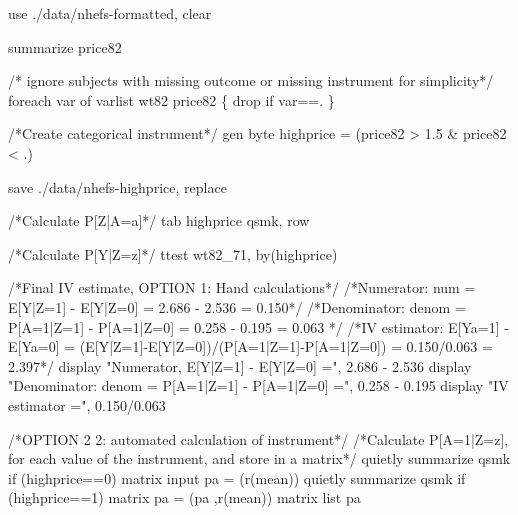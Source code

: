 \documentclass[
  10pt,
  a4paper,
]{book}
\newenvironment{Shaded}{\begin{snugshade}}{\end{snugshade}}
\newcommand{\CommentTok}[1]{\textcolor[rgb]{0.37,0.37,0.37}{#1}}
\newcommand{\FunctionTok}[1]{\textcolor[rgb]{0.28,0.35,0.67}{#1}}
\newcommand{\KeywordTok}[1]{\textcolor[rgb]{0.00,0.46,0.62}{#1}}
\newcommand{\NormalTok}[1]{\textcolor[rgb]{0.00,0.46,0.62}{#1}}
\newcommand{\OtherTok}[1]{\textcolor[rgb]{0.00,0.46,0.62}{#1}}
\newcommand{\StringTok}[1]{\textcolor[rgb]{0.13,0.47,0.30}{#1}}
\begin{document}
\begin{Shaded}
\begin{Highlighting}[]
\KeywordTok{use}\NormalTok{ ./}\KeywordTok{data}\NormalTok{/nhefs{-}formatted, }\KeywordTok{clear}

\KeywordTok{summarize}\NormalTok{ price82}

\CommentTok{/* ignore subjects with missing outcome or missing instrument for simplicity*/}
\KeywordTok{foreach} \KeywordTok{var} \KeywordTok{of} \KeywordTok{varlist}\NormalTok{ wt82 price82 \{}
  \KeywordTok{drop} \KeywordTok{if} \OtherTok{\textasciigrave{}var\textquotesingle{}}\NormalTok{==.}
\NormalTok{\}}

\CommentTok{/*Create categorical instrument*/}
\KeywordTok{gen} \KeywordTok{byte}\NormalTok{ highprice = (price82 \textgreater{} 1.5 \& price82 \textless{} .)}

\KeywordTok{save}\NormalTok{ ./}\KeywordTok{data}\NormalTok{/nhefs{-}highprice, }\KeywordTok{replace}

\CommentTok{/*Calculate P[Z|A=a]*/}
\KeywordTok{tab}\NormalTok{ highprice qsmk, }\OtherTok{row}

\CommentTok{/*Calculate P[Y|Z=z]*/}
\KeywordTok{ttest}\NormalTok{ wt82\_71, }\KeywordTok{by}\NormalTok{(highprice)}

\CommentTok{/*Final IV estimate, OPTION 1: Hand calculations*/}
\CommentTok{/*Numerator: num = E[Y|Z=1] {-} E[Y|Z=0] = 2.686 {-} 2.536 = 0.150*/}
\CommentTok{/*Denominator: denom = P[A=1|Z=1] {-} P[A=1|Z=0] = 0.258 {-} 0.195 = 0.063 */} 
\CommentTok{/*IV estimator: E[Ya=1] {-} E[Ya=0] = }
\CommentTok{(E[Y|Z=1]{-}E[Y|Z=0])/(P[A=1|Z=1]{-}P[A=1|Z=0]) = 0.150/0.063 = 2.397*/}
\KeywordTok{display} \StringTok{"Numerator, E[Y|Z=1] {-} E[Y|Z=0] ="}\NormalTok{, 2.686 {-} 2.536}
\KeywordTok{display} \StringTok{"Denominator: denom = P[A=1|Z=1] {-} P[A=1|Z=0] ="}\NormalTok{, 0.258 {-} 0.195}
\KeywordTok{display} \StringTok{"IV estimator ="}\NormalTok{, 0.150/0.063}

\CommentTok{/*OPTION 2 2: automated calculation of instrument*/}
\CommentTok{/*Calculate P[A=1|Z=z], for each value of the instrument, }
\CommentTok{and store in a matrix*/}
\KeywordTok{quietly} \KeywordTok{summarize}\NormalTok{ qsmk }\KeywordTok{if}\NormalTok{ (highprice==0)}
\FunctionTok{matrix}\NormalTok{ input pa = (}\OtherTok{\textasciigrave{}r(mean)\textquotesingle{}}\NormalTok{)}
\KeywordTok{quietly} \KeywordTok{summarize}\NormalTok{ qsmk }\KeywordTok{if}\NormalTok{ (highprice==1)}
\FunctionTok{matrix}\NormalTok{ pa = (pa ,}\OtherTok{\textasciigrave{}r(mean)\textquotesingle{}}\NormalTok{)}
\FunctionTok{matrix} \OtherTok{list}\NormalTok{ pa}


\end{Highlighting}
\end{Shaded}
\end{document}
